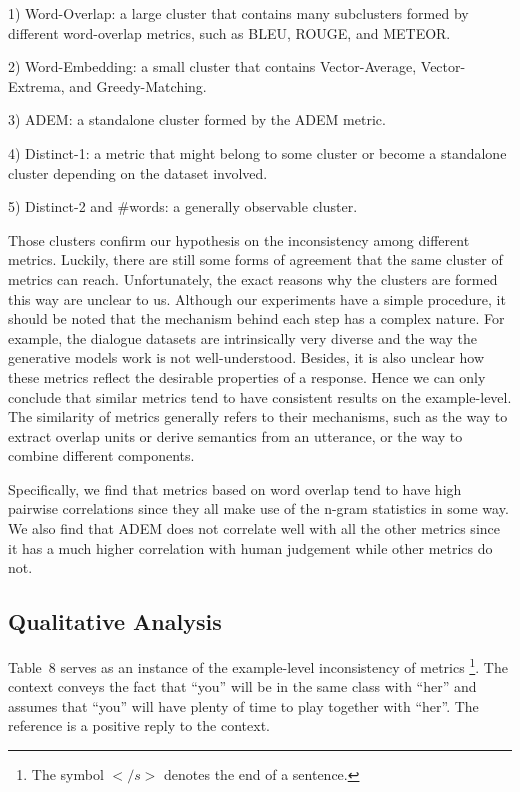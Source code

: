\documentclass[conference]{IEEEtran}
\begin{document}
1) Word-Overlap: a large cluster that contains many subclusters formed by different word-overlap metrics, such as BLEU, ROUGE, and METEOR.

2) Word-Embedding: a small cluster that contains Vector-Average, Vector-Extrema, and Greedy-Matching.

3) ADEM: a standalone cluster formed by the ADEM metric.

4) Distinct-1: a metric that might belong to some cluster or become a standalone cluster depending on the dataset involved.

5) Distinct-2 and \#words: a generally observable cluster.

Those clusters confirm our hypothesis on the inconsistency among different metrics.
Luckily, there are still some forms of agreement that the same cluster of metrics can reach.
Unfortunately, the exact reasons why the clusters are formed this way are unclear to us.
Although our experiments have a simple procedure, it should be noted that the mechanism behind each step has a complex nature.
For example, the dialogue datasets are intrinsically very diverse and the way the generative models work is not well-understood.
Besides, it is also unclear how these metrics reflect the desirable properties of a response.
Hence we can only conclude that similar metrics tend to have consistent results on the example-level.
The similarity of metrics generally refers to their mechanisms, such as the way to extract overlap units or derive semantics from an utterance, or the way to combine different components.

Specifically, we find that metrics based on word overlap tend to have high pairwise correlations since they all make use of the n-gram statistics in some way.
We also find that ADEM does not correlate well with all the other metrics since it has a much higher correlation with human judgement while other metrics do not.

\subsection{Qualitative Analysis}

Table~8 serves as an instance of the example-level inconsistency of metrics
\footnote{The symbol $</s>$ denotes the end of a sentence.}.
The context conveys the fact that ``you'' will be in the same class with ``her''
and assumes that ``you'' will have plenty of time to play together with ``her''.
The reference is a positive reply to the context.
\end{document}
